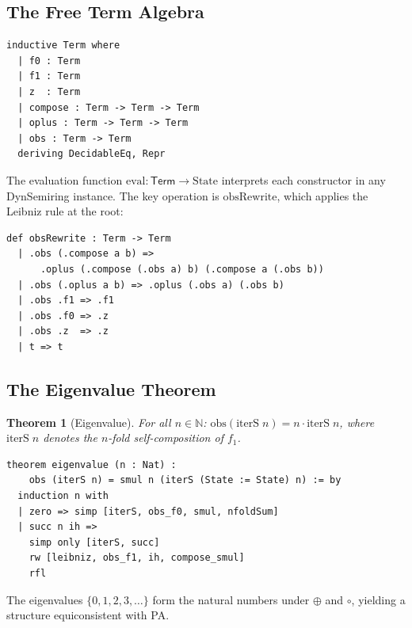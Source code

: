 \documentclass[11pt,a4paper]{article}
\newtheorem{theorem}{Theorem}[section]
\theoremstyle{definition}
\theoremstyle{remark}
\newcommand{\compose}{\mathbin{\circ}}
\newcommand{\opl}{\oplus}
\newcommand{\obs}{\mathrm{obs}}
\newcommand{\fone}{f_1}
\newcommand{\Term}{\mathsf{Term}}
\newcommand{\eval}{\mathrm{eval}}
\newcommand{\obsRewrite}{\mathrm{obsRewrite}}
\newcommand{\smul}[2]{#1 \cdot #2}
\newcommand{\iterS}{\mathrm{iterS}}
\newcommand{\N}{\mathbb{N}}
\begin{document}
\subsection{The Free Term Algebra}

\begin{lstlisting}[caption={Term inductive type (Obstruction/Encoding.lean)}]
inductive Term where
  | f0 : Term
  | f1 : Term
  | z  : Term
  | compose : Term -> Term -> Term
  | oplus : Term -> Term -> Term
  | obs : Term -> Term
  deriving DecidableEq, Repr
\end{lstlisting}

The evaluation function $\eval : \Term \to \mathrm{State}$ interprets each
constructor in any DynSemiring instance. The key operation is
$\obsRewrite$, which applies the Leibniz rule at the root:

\begin{lstlisting}[caption={One-step extensionalization (Obstruction/Encoding.lean)}]
def obsRewrite : Term -> Term
  | .obs (.compose a b) =>
      .oplus (.compose (.obs a) b) (.compose a (.obs b))
  | .obs (.oplus a b) => .oplus (.obs a) (.obs b)
  | .obs .f1 => .f1
  | .obs .f0 => .z
  | .obs .z  => .z
  | t => t
\end{lstlisting}

\subsection{The Eigenvalue Theorem}

\begin{theorem}[Eigenvalue]
\label{thm:eigenvalue}
For all $n \in \N$:
$\obs(\iterS\; n) = \smul{n}{\iterS\; n}$,
where $\iterS\; n$ denotes the $n$-fold self-composition of $\fone$.
\end{theorem}

\begin{lstlisting}[caption={Eigenvalue theorem (Core/Semiring.lean)}]
theorem eigenvalue (n : Nat) :
    obs (iterS n) = smul n (iterS (State := State) n) := by
  induction n with
  | zero => simp [iterS, obs_f0, smul, nfoldSum]
  | succ n ih =>
    simp only [iterS, succ]
    rw [leibniz, obs_f1, ih, compose_smul]
    rfl
\end{lstlisting}

The eigenvalues $\{0, 1, 2, 3, \ldots\}$ form the natural numbers under
$\opl$ and $\compose$, yielding a structure equiconsistent with PA.

\end{document}
